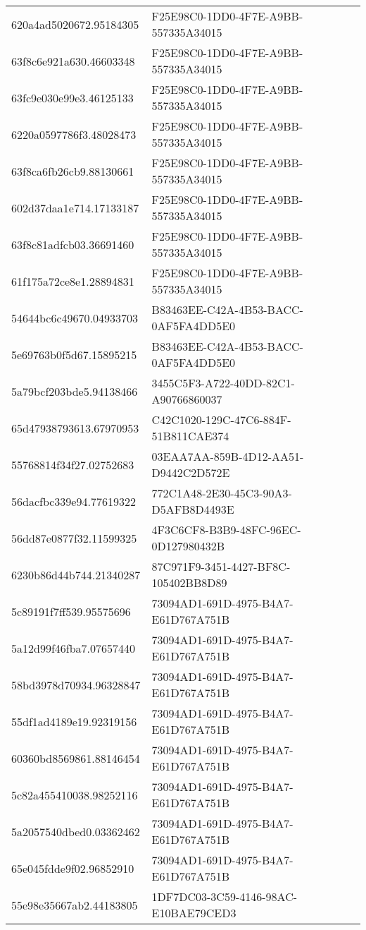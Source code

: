 \begin{tabular}{ll}
620a4ad5020672.95184305 & F25E98C0-1DD0-4F7E-A9BB-557335A34015 \\
63f8c6e921a630.46603348 & F25E98C0-1DD0-4F7E-A9BB-557335A34015 \\
63fc9e030e99e3.46125133 & F25E98C0-1DD0-4F7E-A9BB-557335A34015 \\
6220a0597786f3.48028473 & F25E98C0-1DD0-4F7E-A9BB-557335A34015 \\
63f8ca6fb26cb9.88130661 & F25E98C0-1DD0-4F7E-A9BB-557335A34015 \\
602d37daa1e714.17133187 & F25E98C0-1DD0-4F7E-A9BB-557335A34015 \\
63f8c81adfcb03.36691460 & F25E98C0-1DD0-4F7E-A9BB-557335A34015 \\
61f175a72ce8e1.28894831 & F25E98C0-1DD0-4F7E-A9BB-557335A34015 \\
54644bc6c49670.04933703 & B83463EE-C42A-4B53-BACC-0AF5FA4DD5E0 \\
5e69763b0f5d67.15895215 & B83463EE-C42A-4B53-BACC-0AF5FA4DD5E0 \\
5a79bcf203bde5.94138466 & 3455C5F3-A722-40DD-82C1-A90766860037 \\
65d47938793613.67970953 & C42C1020-129C-47C6-884F-51B811CAE374 \\
55768814f34f27.02752683 & 03EAA7AA-859B-4D12-AA51-D9442C2D572E \\
56dacfbc339e94.77619322 & 772C1A48-2E30-45C3-90A3-D5AFB8D4493E \\
56dd87e0877f32.11599325 & 4F3C6CF8-B3B9-48FC-96EC-0D127980432B \\
6230b86d44b744.21340287 & 87C971F9-3451-4427-BF8C-105402BB8D89 \\
5c89191f7ff539.95575696 & 73094AD1-691D-4975-B4A7-E61D767A751B \\
5a12d99f46fba7.07657440 & 73094AD1-691D-4975-B4A7-E61D767A751B \\
58bd3978d70934.96328847 & 73094AD1-691D-4975-B4A7-E61D767A751B \\
55df1ad4189e19.92319156 & 73094AD1-691D-4975-B4A7-E61D767A751B \\
60360bd8569861.88146454 & 73094AD1-691D-4975-B4A7-E61D767A751B \\
5c82a455410038.98252116 & 73094AD1-691D-4975-B4A7-E61D767A751B \\
5a2057540dbed0.03362462 & 73094AD1-691D-4975-B4A7-E61D767A751B \\
65e045fdde9f02.96852910 & 73094AD1-691D-4975-B4A7-E61D767A751B \\
55e98e35667ab2.44183805 & 1DF7DC03-3C59-4146-98AC-E10BAE79CED3 \\

\end{tabular}
